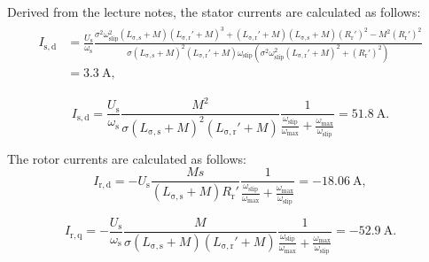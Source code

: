 
\begin{solutionblock}
    Derived from the lecture notes, the stator currents are calculated as follows:
    \begin{align}
        \begin{split}
        I_{\mathrm{s,d}} &= \frac{U_{\mathrm{s}}}{\omega_{\mathrm{s}}} \frac{\sigma^2\omega_{\mathrm{slip}}^2 \left(L_{\mathrm{\sigma,s}}+M\right)\left(L_{\mathrm{\sigma,r}}'+M\right)^3 + \left(L_{\mathrm{\sigma,r}}'+M\right)\left(L_{\mathrm{\sigma,s}}+M\right)\left(R_{\mathrm{r}}'\right)^2 - M^2 \left(R_{\mathrm{r}}'\right)^2}{\sigma \left(L_{\mathrm{\sigma,s}}+M\right)^2 \left(L_{\mathrm{\sigma,r}}'+M\right)\omega_{\mathrm{slip}}\left(\sigma^2 \omega_{\mathrm{slip}}^2 \left(L_{\mathrm{\sigma,r}}'+M\right)^2 + \left(R_{\mathrm{r}}'\right)^2\right)}\\
        &= \SI{3.3}{\ampere},
        \end{split}
    \end{align}
    
    \begin{equation}
        I_{\mathrm{s,d}} = \frac{U_{\mathrm{s}}}{\omega_{\mathrm{s}}} \frac{M^2}{\sigma\left(L_{\mathrm{\sigma,s}}+M\right)^2 \left(L_{\mathrm{\sigma,r}}'+M\right)} \frac{1}{\frac{\omega_{\mathrm{slip}}}{\omega_{\mathrm{max}}} + \frac{\omega_{\mathrm{max}}}{\omega_{\mathrm{slip}}}}
        = \SI{51.8}{\ampere}.
    \end{equation}
    
    
    The rotor currents are calculated as follows:
    \begin{equation}
        I_{\mathrm{r,d}} = -U_{\mathrm{s}} \frac{M s}{\left(L_{\mathrm{\sigma,s}}+M\right) R_{\mathrm{r}}'}\frac{1}{\frac{\omega_{\mathrm{slip}}}{\omega_{\mathrm{max}}} + \frac{\omega_{\mathrm{max}}}{\omega_{\mathrm{slip}}}}
        = \SI{-18.06}{\ampere},
    \end{equation}

    \begin{equation}
        I_{\mathrm{r,q}} = -\frac{U_{\mathrm{s}}}{\omega_{\mathrm{s}}}\frac{M}{\sigma \left(L_{\mathrm{\sigma,s}}+M\right)\left(L_{\mathrm{\sigma,r}}'+M\right)}\frac{1}{\frac{\omega_{\mathrm{slip}}}{\omega_{\mathrm{max}}} + \frac{\omega_{\mathrm{max}}}{\omega_{\mathrm{slip}}}}
        = \SI{-52.9}{\ampere}.
    \end{equation}

    

\end{solutionblock}


